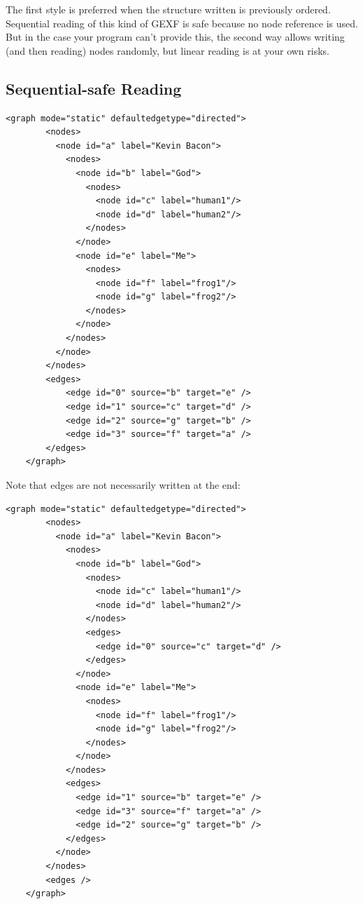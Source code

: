 \documentclass[a4paper,10pt]{article}
\begin{document}
The first style is preferred when the structure written is previously ordered. Sequential reading of this kind of GEXF is safe because no node reference is used. But in the case your program can't provide this, the second way allows writing (and then reading) nodes randomly, but linear reading is at your own risks.

\subsection{Sequential-safe Reading}

\lstset{ style=gexf }
\begin{lstlisting}[caption={First way},label=hierarchy1]
    <graph mode="static" defaultedgetype="directed">
        <nodes>
          <node id="a" label="Kevin Bacon">
            <nodes>
              <node id="b" label="God">
                <nodes>
                  <node id="c" label="human1"/>
                  <node id="d" label="human2"/>
                </nodes>
              </node>
              <node id="e" label="Me">
                <nodes>
                  <node id="f" label="frog1"/>
                  <node id="g" label="frog2"/>
                </nodes>
              </node>
            </nodes>
          </node>
        </nodes>
        <edges>
            <edge id="0" source="b" target="e" />
            <edge id="1" source="c" target="d" />
            <edge id="2" source="g" target="b" />
            <edge id="3" source="f" target="a" />
        </edges>
    </graph>
\end{lstlisting}

Note that edges are not necessarily written at the end:
\lstset{ style=gexf }
\begin{lstlisting}[caption={First way with edges inside clusters},label=hierarchy11]
    <graph mode="static" defaultedgetype="directed">
        <nodes>
          <node id="a" label="Kevin Bacon">
            <nodes>
              <node id="b" label="God">
                <nodes>
                  <node id="c" label="human1"/>
                  <node id="d" label="human2"/>
                </nodes>
                <edges>
                  <edge id="0" source="c" target="d" />
                </edges>
              </node>
              <node id="e" label="Me">
                <nodes>
                  <node id="f" label="frog1"/>
                  <node id="g" label="frog2"/>
                </nodes>
              </node>
            </nodes>
            <edges>
              <edge id="1" source="b" target="e" />
              <edge id="3" source="f" target="a" />
              <edge id="2" source="g" target="b" />
            </edges>
          </node>
        </nodes>
        <edges />
    </graph>
\end{lstlisting}
\end{document}
